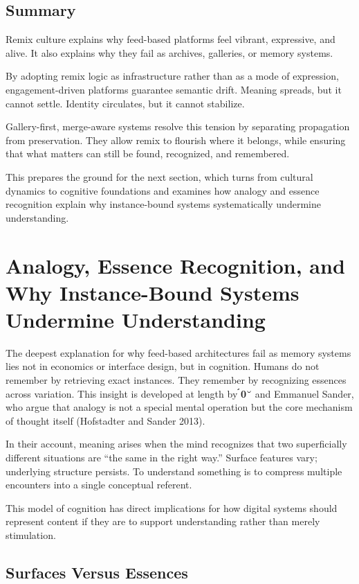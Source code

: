 \documentclass[11pt,oneside]{article}
\begin{document}
\subsection{Summary}

Remix culture explains why feed-based platforms feel vibrant, expressive, and alive. It also explains why they fail as archives, galleries, or memory systems.

By adopting remix logic as infrastructure rather than as a mode of expression, engagement-driven platforms guarantee semantic drift. Meaning spreads, but it cannot settle. Identity circulates, but it cannot stabilize.

Gallery-first, merge-aware systems resolve this tension by separating propagation from preservation. They allow remix to flourish where it belongs, while ensuring that what matters can still be found, recognized, and remembered.

This prepares the ground for the next section, which turns from cultural dynamics to cognitive foundations and examines how analogy and essence recognition explain why instance-bound systems systematically undermine understanding.

\section{Analogy, Essence Recognition, and Why Instance-Bound Systems Undermine Understanding}

The deepest explanation for why feed-based architectures fail as memory systems lies not in economics or interface design, but in cognition. Humans do not remember by retrieving exact instances. They remember by recognizing essences across variation. This insight is developed at length by \textbf{0} and Emmanuel Sander, who argue that analogy is not a special mental operation but the core mechanism of thought itself (Hofstadter and Sander 2013).

In their account, meaning arises when the mind recognizes that two superficially different situations are “the same in the right way.” Surface features vary; underlying structure persists. To understand something is to compress multiple encounters into a single conceptual referent.

This model of cognition has direct implications for how digital systems should represent content if they are to support understanding rather than merely stimulation.

\subsection{Surfaces Versus Essences}
\end{document}

